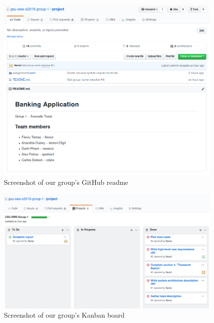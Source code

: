 \documentclass[
10pt, %
a4paper, %
oneside, %
headinclude,footinclude, %
BCOR5mm, %
]{scrartcl}
\begin{document}
\begin{figure}[H]
  \centering
    \includegraphics[width=\textwidth]{github_readme.png}
  \caption{Screenshot of our group's GitHub readme}
\end{figure}

\begin{figure}[H]
  \centering
    \includegraphics[width=\textwidth]{github_project.png}
  \caption{Screenshot of our group's Kanban board}
\end{figure}
\end{document}
